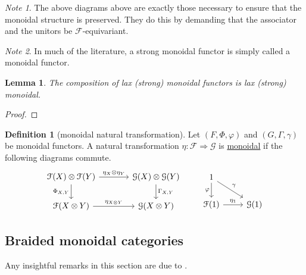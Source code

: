 \documentclass[a4paper]{report}
\newcommand{\defn}[1]{\ul{#1}}
\theoremstyle{definition}
\newtheorem{definition}{Definition}[section]
\theoremstyle{plain}
\newtheorem{lemma}{Lemma}[section]
\theoremstyle{remark}
\newtheorem{note}{Note}[section]
\begin{document}
\begin{note}
  The above diagrams above are exactly those necessary to ensure that the monoidal structure is preserved. They do this by demanding that the associator and the unitors be $\mathcal{F}$-equivariant.
\end{note} 

\begin{note}
  In much of the literature, a strong monoidal functor is simply called a monoidal functor.
\end{note}

\begin{lemma}
  The composition of lax (strong) monoidal functors is lax (strong) monoidal.
\end{lemma}
\begin{proof}

\end{proof}

\begin{definition}[monoidal natural transformation]
  \label{def:monoidalnaturatransformation}
  Let $(F, \Phi, \varphi)$ and $(G, \Gamma, \gamma)$ be monoidal functors. A natural transformation $\eta: \mathcal{F} \Rightarrow \mathcal{G}$ is \defn{monoidal} if the following diagrams commute.
  \begin{equation*}
    \begin{tikzcd}[column sep=large]
      \mathcal{F}(X) \otimes \mathcal{F}(Y) 
      \arrow[r, "\eta_{X} \otimes \eta_{Y}"]
      \arrow[d, swap, "{\Phi_{X, Y}}"]
      & \mathcal{G}(X) \otimes \mathcal{G}(Y)
      \arrow[d, "{\Gamma_{X, Y}}"]
      \\
      \mathcal{F}(X \otimes Y)
      \arrow[r, "\eta_{X \otimes Y}"]
      & \mathcal{G}(X \otimes Y)
    \end{tikzcd}
    \qquad
    \begin{tikzcd}
      1
      \arrow[d, swap, "\varphi"]
      \arrow[dr, "\gamma"]
      \\
      \mathcal{F}(1)
      \arrow[r, "\eta_{1}"]
      & \mathcal{G}(1)
    \end{tikzcd}
  \end{equation*}
\end{definition}

\subsection{Braided monoidal categories}
Any insightful remarks in this section are due to \cite{baez-this-weeks-finds-137}.
\end{document}
